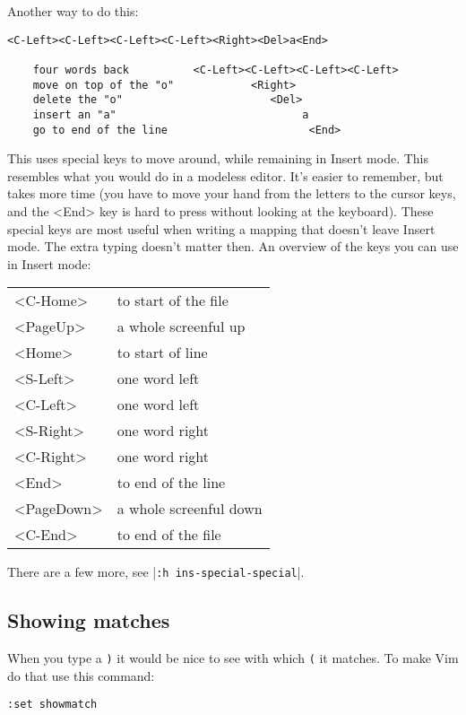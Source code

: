 Another way to do this:

\begin{Verbatim}[samepage=true]
     <C-Left><C-Left><C-Left><C-Left><Right><Del>a<End>

    four words back          <C-Left><C-Left><C-Left><C-Left>
    move on top of the "o"            <Right>
    delete the "o"                       <Del>
    insert an "a"                             a
    go to end of the line                      <End>
\end{Verbatim}

This uses special keys to move around, while remaining in Insert mode.
This resembles what you would do in a modeless editor.
It's easier to remember, but takes more time (you have to move your hand from the letters to the cursor keys, and the <End> key is hard to press without looking at the keyboard).
These special keys are most useful when writing a mapping that doesn't leave Insert mode.
The extra typing doesn't matter then.
An overview of the keys you can use in Insert mode:

\begin{center} \begin{tabular}{l l}
				<C-Home> & to start of the file \\
				<PageUp> & a whole screenful up \\
				<Home> & to start of line \\
				<S-Left> & one word left \\
				<C-Left> & one word left \\
				<S-Right> & one word right \\
				<C-Right> & one word right \\
				<End> & to end of the line \\
				<PageDown> & a whole screenful down \\
				<C-End> & to end of the file
\end{tabular} \end{center}

There are a few more, see |\verb!:h ins-special-special!|.
\subsection{Showing matches}
When you type a \verb!)! it would be nice to see with which \verb!(! it matches.
To make Vim do that use this command:

\begin{Verbatim}[samepage=true]
 :set showmatch
\end{Verbatim}

